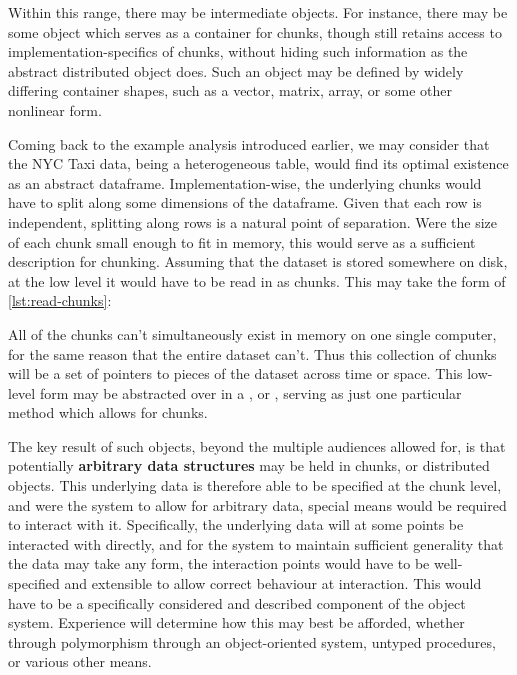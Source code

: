 Within this range, there may be intermediate objects.
For instance, there may be some object which serves as a container for chunks, though still retains access to implementation-specifics of chunks, without hiding such information as the abstract distributed object does.
Such an object may be defined by widely differing container shapes, such as a vector, matrix, array, or some other nonlinear form.

Coming back to the example analysis introduced earlier, we may consider that the NYC Taxi data, being a heterogeneous table, would find its optimal existence as an abstract dataframe.
Implementation-wise, the underlying chunks would have to split along some dimensions of the dataframe.
Given that each row is independent, splitting along rows is a natural point of separation.
Were the size of each chunk small enough to fit in memory, this would serve as a sufficient description for chunking.
Assuming that the dataset is stored somewhere on disk, at the low level it would have to be read in as chunks.
This may take the form of \cref{lst:read-chunks}:


All of the chunks can't simultaneously exist in memory on one single computer, for the same reason that the entire dataset can't.
Thus this collection of chunks will be a set of pointers to pieces of the dataset across time or space.
This low-level form may be abstracted over in a , or , serving as just one particular method which allows for chunks.

The key result of such objects, beyond the multiple audiences allowed for, is that potentially \textbf{arbitrary data structures} may be held in chunks, or distributed objects.
This underlying data is therefore able to be specified at the chunk level, and were the system to allow for arbitrary data, special means would be required to interact with it.
Specifically, the underlying data will at some points be interacted with directly, and for the system to maintain sufficient generality that the data may take any form, the interaction points would have to be well-specified and extensible to allow correct behaviour at interaction.
This would have to be a specifically considered and described component of the object system.
Experience will determine how this may best be afforded, whether through polymorphism through an object-oriented system, untyped procedures, or various other means.

